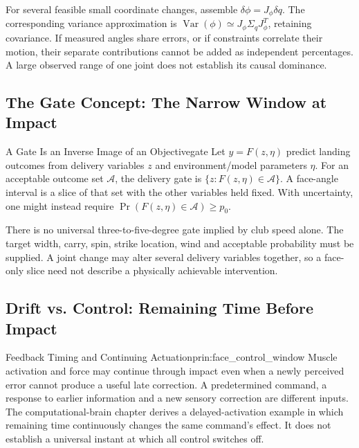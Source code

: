 For several feasible small coordinate changes, assemble
$\delta\phi=J_\phi\delta q$. The corresponding variance approximation is
$\operatorname{Var}(\phi)\simeq J_\phi\Sigma_qJ_\phi^T$, retaining covariance.
If measured angles share errors, or if constraints correlate their motion,
their separate contributions cannot be added as independent percentages.
A large observed range of one joint does not establish its causal dominance.

\subsection{The Gate Concept: The Narrow Window at Impact}

\begin{definition}{A Gate Is an Inverse Image of an Objective}{gate}
Let $y=F(z,\eta)$ predict landing outcomes from delivery variables $z$ and
environment/model parameters $\eta$. For an acceptable outcome set $\mathcal A$,
the delivery gate is $\{z:F(z,\eta)\in\mathcal A\}$. A face-angle interval
is a slice of that set with the other variables held fixed. With uncertainty,
one might instead require $\Pr(F(z,\eta)\in\mathcal A)\ge p_0$.
\end{definition}

There is no universal three-to-five-degree gate implied by club speed alone.
The target width, carry, spin, strike location, wind and acceptable probability
must be supplied. A joint change may alter several delivery variables together,
so a face-only slice need not describe a physically achievable intervention.

\subsection{Drift vs. Control: Remaining Time Before Impact}

\begin{principle}{Feedback Timing and Continuing Actuation}{prin:face_control_window}
Muscle activation and force may continue through impact even when a newly
perceived error cannot produce a useful late correction. A predetermined
command, a response to earlier information and a new sensory correction are
different inputs. The computational-brain chapter derives a delayed-activation
example in which remaining time continuously changes the same command's effect.
It does not establish a universal instant at which all control switches off.
\end{principle}

